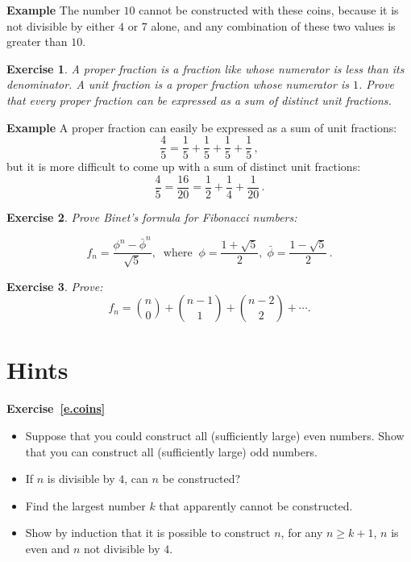 \documentclass[11pt,a4paper]{report}
\newtheorem{exercise}{Exercise}
\begin{document}
\vspace*{-10pt}

\textbf{Example} The number $10$ cannot be constructed with these coins, because it is not divisible by either $4$ or $7$ alone, and any combination of these two values is greater than $10$.

\medskip

\begin{exercise}\label{e.proper}
A \emph{proper fraction} is a fraction like whose numerator is less than its denominator. A \emph{unit fraction} is a proper fraction whose numerator is $1$. Prove that every proper fraction can be expressed as a sum of distinct unit fractions.
\end{exercise}

\vspace*{-10pt}

\textbf{Example} A proper fraction can easily be expressed as a sum of unit fractions:
\[
\frac{4}{5} = \frac{1}{5} + \frac{1}{5} + \frac{1}{5} + \frac{1}{5}\,,
\]
but it is more difficult to come up with a sum of distinct unit fractions:
\[
\frac{4}{5} = \frac{16}{20} = \frac{1}{2} + \frac{1}{4} + \frac{1}{20}\,.
\]

\medskip

\begin{exercise}\label{e.binet}
Prove \emph{Binet's formula} for Fibonacci numbers:

\begin{displaymath}
f_n = \frac{\phi^n - \bar{\phi}^n}{\sqrt{5}}, \;\; \mathrm{where} \;\;
\phi = \frac{1+\sqrt{5}}{2},\;\bar{\phi} = \frac{1-\sqrt{5}}{2}\,.
\end{displaymath}
\end{exercise}

\medskip

\begin{exercise}\label{e.pascal}
Prove:
\[
f_n = {n \choose 0} + {n-1 \choose 1} + {n-2 \choose 2} + \cdots.
\]
\end{exercise}

\newpage

\section{Hints}

\textbf{Exercise~\ref{e.coins}}
\begin{itemize}
\item Suppose that you could construct all (sufficiently large) even numbers. Show that you can construct all (sufficiently large) odd numbers.
\item If $n$ is divisible by $4$, can $n$ be constructed?
\item Find the largest number $k$ that apparently cannot be constructed.
\item Show by induction that it is possible to construct $n$, for any $n\geq k+1$, $n$ is even and $n$ not divisible by $4$.
\end{itemize}
\end{document}
